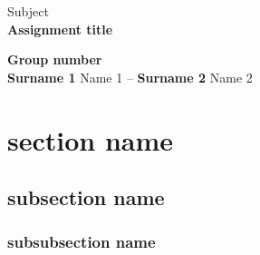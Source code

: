 \documentclass[english, 11pt]{article}
\begin{document}
	\begin{center}
		\Large Subject\\
		\huge \textbf{Assignment title}\\[3mm]
		\begin{framed}
			\Large \textbf{Group number} \\[2mm]
			\normalsize \textbf{Surname 1} Name 1 --  \textbf{Surname 2} Name 2 
		\end{framed}
	\end{center}	
	\FloatBarrier	

	
    \section{section name}
    \label{sec:section name}

    \blindtext

    \subsection{subsection name}
    \label{sub:subsection namesubsection name}

    \blindtext

    \subsubsection{subsubsection name}
    \label{ssub:subsubsection namesubsubsection name}

    \blindmathpaper
    

    
    
\end{document}
